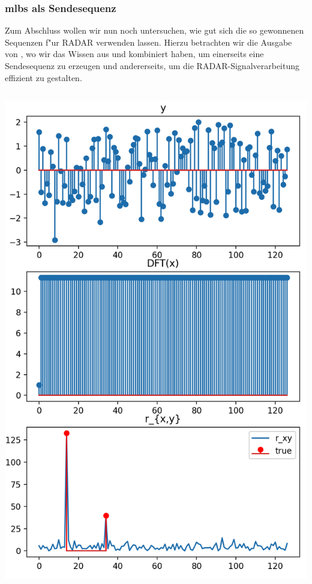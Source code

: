 \subsubsection{\texorpdfstring{\acrshort*{mlbs}}{MLBS} als Sendesequenz}
Zum Abschluss wollen wir nun noch untersuchen, wie gut sich die so gewonnenen Sequenzen f"ur RADAR verwenden lassen.
Hierzu betrachten wir die Ausgabe von , wo wir das Wissen aus  und  kombiniert haben, um einerseits  eine
Sendesequenz zu erzeugen und andererseits, um die RADAR-Signalverarbeitung effizient zu gestalten.
%
\begin{listing}[ht]
    \noindent
    \begin{minipage}{0.51\textwidth}
        \strut\vspace*{-\baselineskip}\newline
        \inputminted[firstline=3, lastline=21]{python3}{code/radar2.py}
    \end{minipage}%
    \begin{minipage}{0.48\textwidth}
        \strut\vspace*{-\baselineskip}\newline
        \includegraphics[width=\textwidth]{code/radar2.png}

\end{minipage}
\end{listing}
